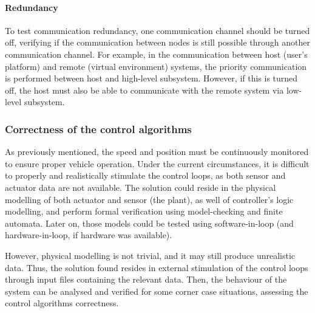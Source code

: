 \paragraph{Redundancy}%
\label{sec:redundancy-test}
To test communication redundancy, one communication channel should be turned
off, verifying if the communication between nodes is still possible through
another communication channel. For example, in the communication between host
(user's platform) and remote (virtual environment) systems, the priority
communication is performed between host and high-level subsystem. However, if
this is turned off, the host must also be able to communicate with the remote
system via low-level subsystem.

\subsubsection{Correctness of the control algorithms}%
\label{sec:correct-control-algorithms-test}
As previously mentioned, the speed and position must be continuously monitored
to ensure proper vehicle operation. Under the current circumstances, it is
difficult to properly and realistically stimulate the control loops, as both
sensor and actuator data are not available. The solution could reside in the
physical modelling of both actuator and sensor (the plant), as well of
controller's logic modelling, and perform formal verification
using model-checking and finite automata. Later on, those models could be tested
using software-in-loop (and hardware-in-loop, if hardware was available). 

However, physical modelling is not trivial, and it may still produce unrealistic
data. Thus, the solution found resides in external stimulation of the control
loops through input files containing the relevant data. Then, the behaviour of
the system can be analysed and verified for some corner case situations,
assessing the control algorithms correctness.
%
%
%


